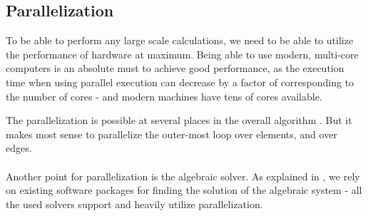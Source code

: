 \subsection{Parallelization}
\label{section:parallel}
To be able to perform any large scale calculations, we need to be able to utilize the performance of hardware at maximum. Being able to use modern, multi-core computers is an absolute must to achieve good performance, as the execution time when using parallel execution can decrease by a factor of corresponding to the number of cores - and modern machines have tens of cores available.

The parallelization is possible at several places in the overall algorithm . But it makes most sense to parallelize the outer-most loop over elements, and over edges.

\paragraph{}
Another point for parallelization is the algebraic solver. As explained in , we rely on existing software packages for finding the solution of the algebraic system  - all the used solvers support and heavily utilize parallelization.